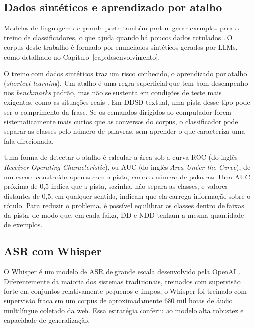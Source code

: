 \documentclass[
    12pt,                %
    openright,           %
    oneside,             %
    a4paper,             %
    english,             %
    brazil               %
]{abntex2}
\begin{document}

\subsection{Dados sintéticos e aprendizado por atalho}
\label{sec:atalho}

Modelos de linguagem de grande porte também podem gerar exemplos para o treino de classificadores, o que ajuda quando há poucos dados rotulados \cite{Moller2024}. O corpus deste trabalho é formado por enunciados sintéticos gerados por LLMs, como detalhado no Capítulo~\ref{cap:desenvolvimento}.

O treino com dados sintéticos traz um risco conhecido, o aprendizado por atalho (\textit{shortcut learning}). Um atalho é uma regra superficial que tem bom desempenho nos \textit{benchmarks} padrão, mas não se sustenta em condições de teste mais exigentes, como as situações reais \cite{Geirhos2020}. Em DDSD textual, uma pista desse tipo pode ser o comprimento da frase. Se os comandos dirigidos ao computador forem sistematicamente mais curtos que as conversas do corpus, o classificador pode separar as classes pelo número de palavras, sem aprender o que caracteriza uma fala direcionada.

Uma forma de detectar o atalho é calcular a área sob a curva ROC (do inglês \textit{Receiver Operating Characteristic}), ou AUC (do inglês \textit{Area Under the Curve}), de um escore construído apenas com a pista, como o número de palavras. Uma AUC próxima de 0,5 indica que a pista, sozinha, não separa as classes, e valores distantes de 0,5, em qualquer sentido, indicam que ela carrega informação sobre o rótulo. Para reduzir o problema, é possível equilibrar as classes dentro de faixas da pista, de modo que, em cada faixa, DD e NDD tenham a mesma quantidade de exemplos.


\subsection{ASR com Whisper}

O Whisper é um modelo de ASR de grande escala desenvolvido pela OpenAI \cite{Radford2023}. Diferentemente da maioria dos sistemas tradicionais, treinados com supervisão forte em conjuntos relativamente pequenos e limpos, o Whisper foi treinado com supervisão fraca em um corpus de aproximadamente 680 mil horas de áudio multilíngue coletado da web. Essa estratégia conferiu ao modelo alta robustez e capacidade de generalização.
\end{document}
